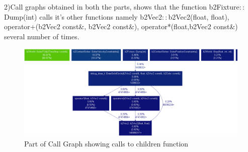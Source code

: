 \documentclass[a4paper,11pt]{article}
\begin{document}
{{2)Call graphs obtained in both the parts, shows that the function b2Fixture$::$Dump(int) calls it's other functions namely b2Vec2$::$b2Vec2(float, float), operator+(b2Vec2 const\&, b2Vec2 const\&), operator*(float,b2Vec2 const\&) several number of times.

\begin{figure}[h]
    \centering
    \includegraphics[scale=0.4]{images/debug_part}
    \caption{Part of Call Graph showing calls to children function}
\end{figure}


}

}

\newpage
\end{document}
